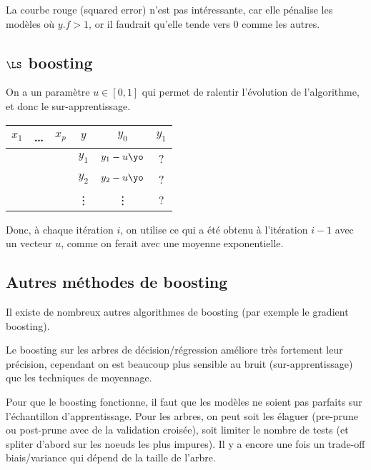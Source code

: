 	La courbe rouge (squared error) n'est pas intéressante, car elle pénalise les modèles où $y.f > 1$, or il faudrait qu'elle tende vers 0 comme les autres.
	
	\subsection{$\LS$ boosting}

		
	On a un paramètre $u \in [0, 1]$ qui permet de ralentir l'évolution de l'algorithme, et donc le sur-apprentissage.
	
	\begin{center}
	\begin{tabular}{ccc|ccc}
	$x_1$ & \dots & $x_p$ & $y$ & $y_0$ & $y_1$ \\ 
	\hline 
	  &   &   & $y_1$ & $y_1 - u\yo$ & ? \\ 
	  &   &   & $y_2$ & $y_2 - u\yo$ & ? \\ 
	  &   &  & \vdots & \vdots & ? \\ 
	\end{tabular} 
	\end{center}
	
	Donc, à chaque itération $i$, on utilise ce qui a été obtenu à l'itération $i - 1$ avec un vecteur $u$, comme on ferait avec une moyenne exponentielle.
	
	\subsection{Autres méthodes de boosting}
	
	Il existe de nombreux autres algorithmes de boosting (par exemple le gradient boosting).
	
	Le boosting sur les arbres de décision/régression améliore très fortement leur précision, cependant on est beaucoup plus sensible au bruit (sur-apprentissage) que les techniques de moyennage.
	
	Pour que le boosting fonctionne, il faut que les modèles ne soient pas parfaits sur l'échantillon d'apprentissage. Pour les arbres, on peut soit les élaguer (pre-prune ou post-prune avec de la validation croisée), soit limiter le nombre de tests (et spliter d'abord sur les noeuds les plus impures). Il y a encore une fois un trade-off biais/variance qui dépend de la taille de l'arbre.
	
